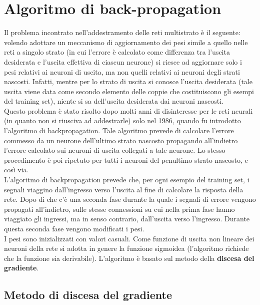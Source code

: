 \chapter{Algoritmo di back-propagation} %
\label{cha:algoritmo_di_back_propagation}
Il problema incontrato nell’addestramento delle reti multistrato è il seguente: volendo adottare un meccanismo di aggiornamento dei pesi simile a quello nelle reti a singolo strato (in cui l’errore è calcolato come differenza tra l’uscita desiderata e l’uscita effettiva di ciascun neurone) si riesce ad aggiornare solo i pesi relativi ai neuroni di uscita, ma non quelli relativi ai neuroni degli strati nascosti. Infatti, mentre per lo strato di uscita si conosce l’uscita desiderata (tale uscita viene data come secondo elemento delle coppie che costituiscono gli esempi del training set), niente si sa dell’uscita desiderata dai neuroni nascosti.\\

Questo problema è stato risolto dopo molti anni di disinteresse per le reti neurali (in quanto non si riusciva ad addestrarle) solo nel 1986, quando fu introdotto l’algoritmo di backpropagation. Tale algoritmo prevede di calcolare l’errore commesso da un neurone dell’ultimo strato nascosto propagando all’indietro l’errore calcolato sui neuroni di uscita collegati a tale neurone. Lo stesso procedimento è poi ripetuto per tutti i neuroni del penultimo strato nascosto, e così via.\\

L’algoritmo di backpropagation prevede che, per ogni esempio del training set, i segnali viaggino dall’ingresso verso l’uscita al fine di calcolare la risposta della rete. Dopo di che c’è una seconda fase durante la quale i segnali di errore vengono propagati all’indietro, sulle stesse connessioni su cui nella prima fase hanno viaggiato gli ingressi, ma in senso contrario, dall’uscita verso l’ingresso. Durante questa seconda fase vengono modificati i pesi.\\

I pesi sono inizializzati con valori casuali. Come funzione di uscita non lineare dei neuroni della rete si adotta in genere la funzione sigmoidea (l’algoritmo richiede che la funzione sia derivabile). L'algoritmo è basato sul metodo della \textbf{discesa del gradiente}.

\section{Metodo di discesa del gradiente} %
\label{sec:metodo_di_discesa_del_gradiente}

